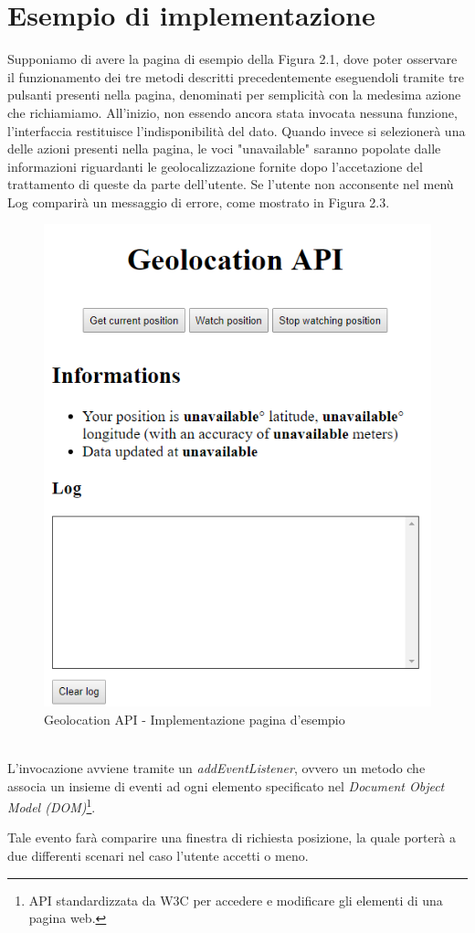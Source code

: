 \documentclass[12pt ,a4paper , twoside , openright ]{book}
\begin{document}
	\section{Esempio di implementazione}
	Supponiamo di avere la pagina di esempio della Figura 2.1, dove poter osservare il funzionamento dei tre metodi descritti precedentemente eseguendoli tramite tre pulsanti presenti nella pagina, denominati per semplicità con la medesima azione che richiamiamo\cite{rif8}. All'inizio, non essendo ancora stata invocata nessuna funzione, l'interfaccia restituisce l'indisponibilità del dato. Quando invece si selezionerà una delle azioni presenti nella pagina, le voci "unavailable" saranno popolate dalle informazioni riguardanti le geolocalizzazione fornite dopo l'accetazione del trattamento di queste da parte dell'utente. Se l'utente non acconsente nel menù Log comparirà un messaggio di errore, come mostrato in Figura 2.3.
	\begin{figure}[h]
		\centering
		\includegraphics[width=0.5\linewidth]{geo1}
		\caption{Geolocation API - Implementazione pagina d'esempio\cite{rif8}}
		\label{fig: Geolocation API - Implementazione pagina d'esempio}
	\end{figure}
	\\
	L'invocazione avviene tramite un \textit{addEventListener}, ovvero un metodo che associa un insieme di eventi ad ogni elemento specificato nel \textit{Document Object Model (DOM)}\footnote{API standardizzata da W3C per accedere e modificare gli elementi di una pagina web.}.	
	\pagebreak
	 
	Tale evento farà comparire una finestra di richiesta posizione, la quale porterà a due differenti scenari nel caso l'utente accetti o meno.
\end{document}
